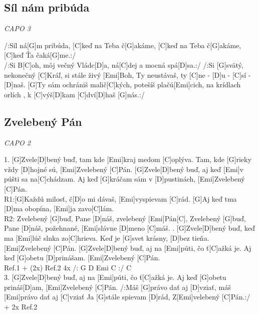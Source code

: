 \documentclass[10pt]{article}
\begin{document}
\begin{Large}
\begin{minipage}{\textwidth}
\subsection{Síl nám pribúda}
\textit{CAPO 3}
\begin{multicols*}{2}
\begin{guitar}	
	/:Síl ná[G]m pribúda, 
	[C]keď na Teba č[G]akáme,
	[C]keď na Teba č[G]akáme,
	[C]keď Ťa čaká[G]me.:/
	\\
	/:Si B[C]oh, môj večný Vládc[D]a,
	ná[C]dej a mocná spá[D]sa.:/
	\columnbreak
	/:Si [G]svätý, nekonečný [C]Kráľ,
	si stále živý [Emi]Boh,
	Ty neustávaš, ty [C]ne - [D]u - [C]sí - [D]naš.
	[G]Ty sám ochrániš malič[C]kých,
	potešíš plačú[Emi]cich,
	na krídlach orlích ,
	k [C]výš[D]kam [C]dví[D]haš [G]nás.:/
\end{guitar}
\end{multicols*}
\end{minipage}

\begin{minipage}{\textwidth}
\subsection{Zvelebený Pán}
\textit{CAPO 2}
\begin{multicols*}{2}
\begin{guitar}	
	1. [G]Zvele[D]bený buď, 
	tam kde [Emi]kraj medom [C]oplýva.
	Tam, kde [G]rieky vždy [D]hojné sú,
	[Emi]Zvelebený [C]Pán.
	[G]Zvele[D]bený buď, 
	aj keď [Emi]v púšti sa na[C]chádzam.
	Aj keď [G]kráčam sám v [D]pustinách,
	[Emi]Zvelebený [C]Pán.
	\\
	R1:[G]Každú milosť, č[D]o mi dávaš,
	[Emi]vyspievam [C]rád.
	[G]Aj keď tma [D]ma obopína,
	[Emi]ja zavo[C]lám.
	\\
	R2: Zvelebený [G]buď, Pane [D]náš,
	zvelebený [Emi]Pán[C],
	Zvelebený [G]buď, Pane [D]náš,
	požehnané, [Emi]slávne [D]meno [C]máš.
	. [G]Zvele[D]bený buď, 
	keď ma [Emi]lúč slnka zo[C]hrieva.
	Keď je [G]svet krásny, [D]bez tieňa.
	[Emi]Zvelebený [C]Pán.
	[G]Zvele[D]bený buď, 
	aj na [Emi]púti, čo ť[C]ažká je.
	Aj keď [G]obetu [D]prinášam.
	[Emi]Zvelebený [C]Pán.
	\\
	Ref.1 + (2x) Ref.2
	4x /: G D Emi C :/ C
	\\
	3. [G]Zvele[D]bený buď, 
	aj na [Emi]púti, čo ť[C]ažká je.
	Aj keď [G]obetu prináš[D]am, 
	[Emi]Zvelebený [C]Pán.
	/:Máš [G]právo dať aj [D]vziať, 
	máš [Emi]právo dať aj [C]vziať
	Ja [G]stále spievam [D]rád, 
	Z[Emi]velebený [C]Pán.:/ + 2x Ref.2
\end{guitar}
\end{multicols*}
\end{minipage}


\end{Large}
\end{document}
